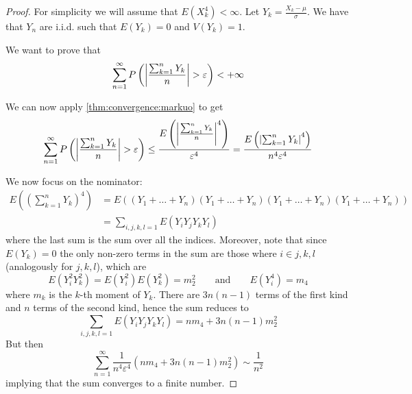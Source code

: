 \documentclass[12pt]{extarticle}
\begin{document}
\begin{proof}
    For simplicity we will assume that $E(X_k^4) < \infty$.
    Let $Y_k = \frac{X_k - \mu}{\sigma}$. We have that $Y_n$ are i.i.d. such that $E(Y_k) = 0$ and $V(Y_k) = 1$.

    We want to prove that
    \begin{equation}
        \sum_{n = 1}^\infty P\left( \abs{\frac{\sum_{k = 1}^n Y_k}{n}} > \varepsilon \right) < + \infty
    \end{equation}

    We can now apply \autoref{thm:convergence:markuo} to get
    \begin{equation}
        \sum_{n = 1}^\infty P\left( \abs{\frac{\sum_{k = 1}^n Y_k}{n}} > \varepsilon \right) \leq \frac{E\left( \abs{\frac{\sum_{k = 1}^n Y_k}{n}}^4 \right)}{\varepsilon^4} = \frac{E\left( \abs{\sum_{k = 1}^n Y_k}^4 \right)}{n^4 \varepsilon^4}
    \end{equation}

    We now focus on the nominator:
    \begin{equation}
        \begin{split}
            E\left( \left(\sum_{k = 1}^n Y_k\right)^4 \right) & = E\left( (Y_1 + \dots + Y_n)(Y_1 + \dots + Y_n)(Y_1 + \dots + Y_n)(Y_1 + \dots + Y_n) \right) \\
                                                              & = \sum_{i, j, k, l = 1} E(Y_i Y_j Y_k Y_l)
        \end{split}
    \end{equation}
    where the last sum is the sum over all the indices.
    Moreover, note that since $E(Y_k) = 0$ the only non-zero terms in the sum are those where $i \in {j, k, l}$ (analogously for $j, k, l$),
    which are
    \begin{equation}
        E(Y_i^2 Y_k^2) = E(Y_i^2)E(Y_k^2) = m_2^2 \qquad \text{and} \qquad E(Y_i^4) = m_4
    \end{equation}
    where $m_k$ is the $k$-th moment of $Y_k$.
    There are $3n(n-1)$ terms of the first kind and $n$ terms of the second kind, hence the sum reduces to
    \begin{equation}
        \sum_{i, j, k, l = 1} E(Y_i Y_j Y_k Y_l) = nm_4 + 3n(n-1)m_2^2
    \end{equation}
    But then
    \begin{equation}
        \sum_{n = 1}^\infty \frac{1}{n^4 \varepsilon^4}(nm_4 + 3 n(n-1)m_2^2) \sim \frac{1}{n^2}
    \end{equation}
    implying that the sum converges to a finite number.
\end{proof}
\end{document}
